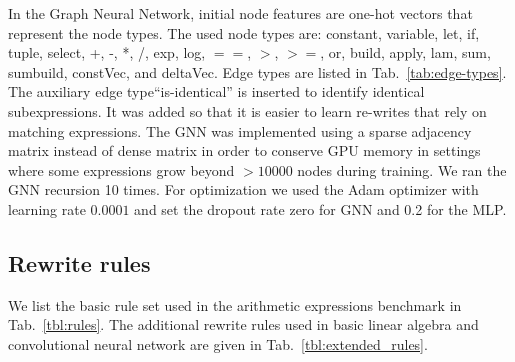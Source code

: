 \documentclass[fullpage,twocolumn]{article} %
\begin{document}
In the Graph Neural Network, initial node features are one-hot vectors that represent the node types. The used node types are: {constant, variable, let, if, tuple, select, +, -, *, /, exp, log, $==$, $>$, $>=$, or, build, apply, lam, sum, sumbuild, constVec, and deltaVec}.
%
Edge types are listed in Tab.~\ref{tab:edge-types}. The auxiliary edge type``is-identical'' is inserted to identify identical subexpressions. It was added so that it is easier to learn re-writes that rely on matching expressions. %
The GNN was implemented using a sparse adjacency matrix instead of dense matrix in order to conserve GPU memory in settings where some expressions grow beyond $>10000$ nodes during training. We ran the GNN recursion 10 times.  For optimization we used the Adam optimizer with learning rate $0.0001$ and set the dropout rate zero for GNN and 0.2 for the MLP.
%



\subsection{Rewrite rules}
\label{appendix-rewrites}
We list the basic rule set used in the arithmetic expressions benchmark in Tab.~\ref{tbl:rules}. The additional rewrite rules used in basic linear algebra and convolutional neural network are given in Tab.~\ref{tbl:extended_rules}.
\end{document}
